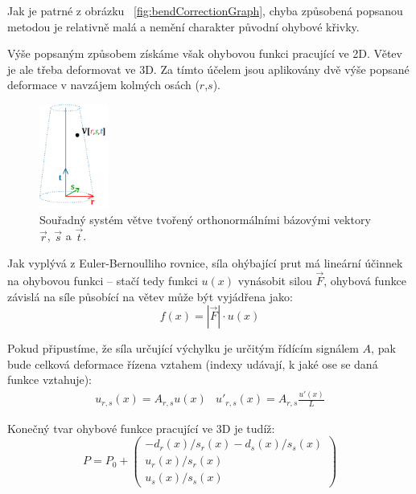 Jak je patrné z obrázku ~\ref{fig:bendCorrectionGraph}, chyba způsobená popsanou metodou je relativně malá a nemění charakter původní ohybové křivky.

Výše popsaným způsobem získáme však ohybovou funkci pracující ve 2D. Větev je ale třeba deformovat ve 3D. Za tímto účelem jsou aplikovány dvě výše popsané deformace v navzájem kolmých osách ($r$,$s$). 

\begin{figure}[!hbt]
\begin{center}
\includegraphics[width=0.2\textwidth]{./figures/branchCoords.png}
\end{center}
\caption[Souřadný systém větve]%
{Souřadný systém větve tvořený orthonormálními bázovými vektory $\vec{r}$, $\vec{s}$ a $\vec{t}$.
\label{fig:branchCoords}
}
\end{figure}

Jak vyplývá z Euler-Bernoulliho rovnice, síla ohýbající prut má lineární účinnek na ohybovou funkci – stačí tedy funkci $u(x)$ vynásobit silou $\vec{F}$, ohybová funkce závislá na síle působící na větev může být vyjádřena jako:
 \begin{equation}
\label{forceEq}
f(x) = |\vec{F}| \cdot u(x)
\end{equation}

Pokud připustíme, že síla určující výchylku je určitým řídícím signálem $A$, pak bude celková deformace řízena vztahem (indexy udávají, k jaké ose se daná funkce vztahuje):
\begin{equation}
\begin{array}{cc}
u_{r,s}(x) = A_{r,s}u(x) & {u}'_{r,s}(x) = A_{r,s}\frac{{u}'(x)}{L}
\end{array}
\end{equation}


Konečný tvar ohybové funkce pracující ve 3D je tudíž:
\begin{equation}
P = P_0 + \begin{pmatrix}
-d_r(x)/ s_r(x)-d_s(x)/s_s(x) \\ u_r(x)/s_r(x) \\ u_s(x)/s_s(x)
\end{pmatrix}
\end{equation}

